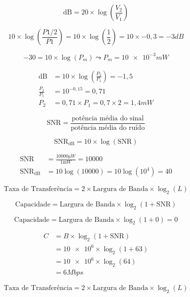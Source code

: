 \documentclass{minimal}
\begin{document}
\begin{equation*}
  \text{dB} = 20 \times \log\left({\frac{V_2}{V_1}}\right)
\end{equation*}

\begin{equation*}
  10 \times \log\left(\frac{P1/2}{P1}\right) = 10 \times \log\left(\frac{1}{2}\right) = 10 \times -0,3 = -3 \unit{dB}
\end{equation*}

\begin{equation*}
  -30 = 10 \times \log\left(P_m\right) \leadsto P_m= \num{10e-3} \unit{mW}
\end{equation*}

\begin{align*}
  \text{dB} &= 10 \times \log\left(\frac{P_2}{P_1}\right) = -1,5 \\
  \frac{P_2}{P_1} &= 10^{-0,15} = 0,71 \\
  P_2 &= 0,71 \times P_1 = 0,7 \times 2 = 1,4 \unit{mW}
\end{align*}

\begin{equation*}
  \text{SNR} = \frac{\text{potência média do sinal}}{\text{potência média do ruído}}
\end{equation*}

\[\text{SNR}_\text{dB} = 10 \times \log(\text{SNR})\]

\begin{align*}
  \text{SNR} &= \frac{10000 \unit{\micro W}}{1 \unit{\milli W}} = 10000 \\
  \text{SNR}_\text{dB} &= 10 \log(10000) = 10 \log(10^4) = 40
\end{align*}

\[\text{Taxa de Transferência} = 2 \times \text{Largura de Banda} \times \log_2\left(L\right)\]

\[\text{Capacidade} = \text{Largura de Banda} \times \log_2\left(1 + \text{SNR}\right)\]

\[\text{Capacidade} = \text{Largura de Banda} \times \log_2(1 + 0) = 0\]



\begin{align*}
  C &= B \times \log_2(1 + \text{SNR})
\\ &= \num{10e6} \times \log_2(1 + 63)
\\ &= \num{10e6} \times \log_2(64)
\\ &= 6 \unit{Mbps}
\end{align*}

\[\text{Taxa de Transferência} = 2 \times \text{Largura de Banda} \times \log_2(L)\]
\end{document}
